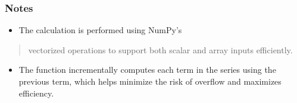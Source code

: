 \documentclass[a4paper,10pt,oneside,english]{sphinxmanual}
\begin{document}
\begin{fulllineitems}
\begin{sphinxVerbatim}[commandchars=\\\{\}]
\end{sphinxVerbatim}

\begin{sphinxVerbatim}[commandchars=\\\{\}]
\PYG{p}{[}  \PYG{p}{]}
\end{sphinxVerbatim}
\subsubsection*{Notes}
\begin{itemize}
\item {} 
\sphinxAtStartPar
The calculation is performed using NumPy’s

\end{itemize}
\begin{quote}

\sphinxAtStartPar
vectorized operations to support both scalar and array inputs efficiently.
\end{quote}
\begin{itemize}
\item {} 
\sphinxAtStartPar
The function incrementally computes each term in the series using the
previous term,
which helps minimize the risk of overflow and maximizes efficiency.

\end{itemize}

\end{fulllineitems}

\end{document}
